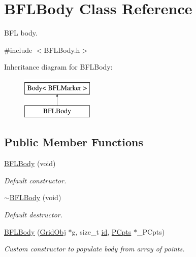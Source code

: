 \hypertarget{class_b_f_l_body}{}\section{B\+F\+L\+Body Class Reference}
\label{class_b_f_l_body}


B\+FL body.  




{\ttfamily \#include $<$B\+F\+L\+Body.\+h$>$}

Inheritance diagram for B\+F\+L\+Body\+:\begin{figure}[H]
\begin{center}
\leavevmode
\includegraphics[height=2.000000cm]{class_b_f_l_body}
\end{center}
\end{figure}
\subsection*{Public Member Functions}
\begin{DoxyCompactItemize}
\item 
\hyperlink{class_b_f_l_body_ab7b3b9f55b59b977401bcf8dead8cfce}{B\+F\+L\+Body} (void)
\begin{DoxyCompactList}\small\item\em Default constructor. \end{DoxyCompactList}\item 
\hyperlink{class_b_f_l_body_ad6d343eed8481d8b652261642e184c43}{$\sim$\+B\+F\+L\+Body} (void)
\begin{DoxyCompactList}\small\item\em Default destructor. \end{DoxyCompactList}\item 
\hyperlink{class_b_f_l_body_a3749d45050b61d0283809ad54da443bf}{B\+F\+L\+Body} (\hyperlink{class_grid_obj}{Grid\+Obj} $\ast$g, size\+\_\+t \hyperlink{class_body_a9d5166d7419f303190b6c6543e67e815}{id}, \hyperlink{class_p_cpts}{P\+Cpts} $\ast$\+\_\+\+P\+Cpts)
\begin{DoxyCompactList}\small\item\em Custom constructor to populate body from array of points. \end{DoxyCompactList}\end{DoxyCompactItemize}
